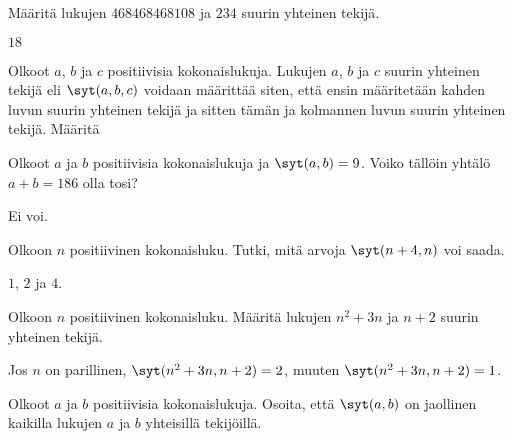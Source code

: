 \begin{kotitehtavasivu}
\begin{tehtava}
\end{tehtava}

\begin{tehtava}
    Määritä lukujen $468468468108$ ja $234$ suurin yhteinen tekijä.
    
    \begin{vastaus}
        $18$
    \end{vastaus}
    
\end{tehtava}

\begin{tehtava}
    Olkoot $a$, $b$ ja $c$ positiivisia kokonaislukuja. Lukujen $a$, $b$ ja $c$ suurin yhteinen tekijä eli $\syt(a, b, c)$ voidaan määrittää siten, että ensin määritetään kahden luvun suurin yhteinen tekijä ja sitten tämän ja kolmannen luvun suurin yhteinen tekijä. Määritä
    

    \begin{vastaus}
    \end{vastaus}
    
\end{tehtava}

\begin{tehtava}
    Olkoot $a$ ja $b$ positiivisia kokonaislukuja ja $\syt(a, b)=9$. Voiko tällöin yhtälö $a + b = 186$ olla tosi?
    
    \begin{vastaus}
        Ei voi.
    \end{vastaus}
    
\end{tehtava}

\begin{tehtava}
    Olkoon $n$ positiivinen kokonaisluku. Tutki, mitä arvoja $\syt(n+4, n)$ voi saada.
    
    \begin{vastaus}
        $1$, $2$ ja $4$.
    \end{vastaus}
    
\end{tehtava}

\begin{tehtava}
    Olkoon $n$ positiivinen kokonaisluku. Määritä lukujen $n^2 + 3n$ ja $n + 2$ suurin yhteinen tekijä.
    
    \begin{vastaus}
        Jos $n$ on parillinen, $\syt(n^2 + 3n, n + 2) = 2$, muuten $\syt(n^2 + 3n, n + 2) = 1$.
    \end{vastaus}
    
\end{tehtava}

\begin{tehtava}
    Olkoot $a$ ja $b$ positiivisia kokonaislukuja. Osoita, että $\syt(a, b)$ on jaollinen kaikilla lukujen $a$ ja $b$ yhteisillä tekijöillä.
\end{tehtava}

\end{kotitehtavasivu}
